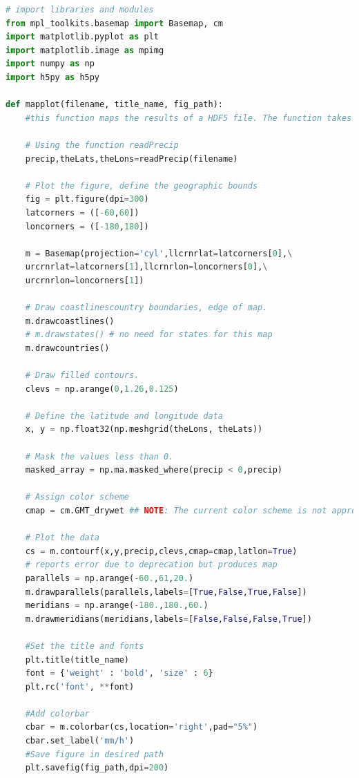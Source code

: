 \documentclass[12pt]{article}
\begin{document}
\begin{lstlisting}[language=Python, caption=Mapping precipitation data]
# import libraries and modules
from mpl_toolkits.basemap import Basemap, cm
import matplotlib.pyplot as plt
import matplotlib.image as mpimg
import numpy as np
import h5py as h5py

def mapplot(filename, title_name, fig_path):
    #this function maps the results of a HDF5 file. The function takes three arguments (the path to the filename, the desired title for the image, and the path to where the plot should be saved)
    
    # Using the function readPrecip
    precip,theLats,theLons=readPrecip(filename)

    # Plot the figure, define the geographic bounds
    fig = plt.figure(dpi=300)
    latcorners = ([-60,60])
    loncorners = ([-180,180])

    m = Basemap(projection='cyl',llcrnrlat=latcorners[0],\
	urcrnrlat=latcorners[1],llcrnrlon=loncorners[0],\
	urcrnrlon=loncorners[1])

    # Draw coastlinescountry boundaries, edge of map.
    m.drawcoastlines()
    # m.drawstates() # no need for states for this map
    m.drawcountries()

    # Draw filled contours.
    clevs = np.arange(0,1.26,0.125)

    # Define the latitude and longitude data
    x, y = np.float32(np.meshgrid(theLons, theLats))

    # Mask the values less than 0.
    masked_array = np.ma.masked_where(precip < 0,precip) 

    # Assign color scheme
    cmap = cm.GMT_drywet ## NOTE: The current color scheme is not appropriate for maps showing anomalies; instead "cmap = plt.cm.RdBu" should be used for any visualization of differences in rainfall.

    # Plot the data
    cs = m.contourf(x,y,precip,clevs,cmap=cmap,latlon=True) 
	# reports error due to deprecation but produces map
    parallels = np.arange(-60.,61,20.)
    m.drawparallels(parallels,labels=[True,False,True,False])
    meridians = np.arange(-180.,180.,60.)
    m.drawmeridians(meridians,labels=[False,False,False,True])

    #Set the title and fonts
    plt.title(title_name)
    font = {'weight' : 'bold', 'size' : 6}
    plt.rc('font', **font)

    #Add colorbar
    cbar = m.colorbar(cs,location='right',pad="5%")
    cbar.set_label('mm/h')
    #Save figure in desired path
    plt.savefig(fig_path,dpi=200) 
\end{lstlisting}
\end{document}
